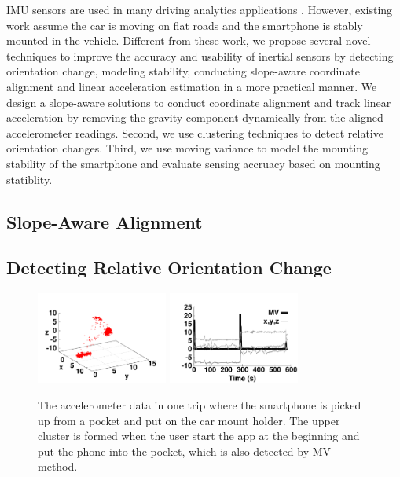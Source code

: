 

IMU sensors are used in many driving analytics 
applications \cite{hansenspeed, wang2013sensing, chen2015invisible}. 
However, existing work assume the car is moving on flat 
roads and the smartphone is stably mounted in the vehicle. 
Different from these work, we propose several novel
techniques to improve the accuracy and usability of inertial sensors
by detecting orientation change, modeling stability,  
conducting slope-aware coordinate alignment and linear
acceleration estimation in a more practical manner. 
We design a slope-aware solutions to conduct 
coordinate alignment and track linear acceleration
by removing the gravity component dynamically from the aligned accelerometer readings. 
Second, we use clustering techniques to detect 
relative orientation changes. 
Third, we use moving variance to model the mounting
stability of the smartphone and evaluate sensing accruacy
based on mounting statiblity. 

\subsection{Slope-Aware Alignment}
\label{slopeaware}

 

\subsection{Detecting Relative Orientation Change}


\begin{figure}[!htbp]
\begin{center}
\includegraphics[width=1.7in,angle=0]{Figs/DriveSense/example_cluster.pdf}
\hspace{-0.8cm}
\includegraphics[width=1.7in,angle=0]{Figs/DriveSense/example_change.pdf}
\vspace{0.0cm}
\caption{The accelerometer data in one trip where the smartphone is picked up
from a pocket and put on the car mount holder. 
The upper cluster is formed when the user start the app at the beginning
and put the phone into the pocket, which is also detected by MV method. }
\vspace{-0.2cm}
\label{example_change}
\end{center}
\end{figure}


